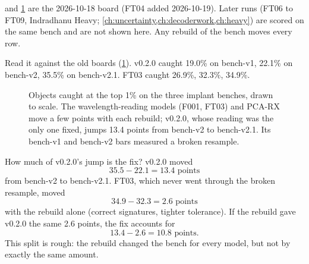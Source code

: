\begin{drift}
 and \cref{fig:sortbug:bars} are the 2026-10-18 board (FT04 added 2026-10-19). Later runs
(FT06 to FT09, Indradhanu Heavy; \cref{ch:uncertainty,ch:decoderwork,ch:heavy}) are scored on the same bench and
are not shown here. Any rebuild of the bench moves every row.
\end{drift}

Read it against the old boards (\cref{fig:sortbug:bars}). v0.2.0 caught 19.0\% on bench-v1, 22.1\% on bench-v2,
35.5\% on bench-v2.1. FT03 caught 26.9\%, 32.3\%, 34.9\%.

\begin{figure}[htbp]
\centering
{}
\caption{Objects caught at the top 1\% on the three implant benches, drawn to scale. The wavelength-reading models
(F001, FT03) and PCA-RX move a few points with each rebuild; v0.2.0, whose reading was the only one fixed, jumps
13.4 points from bench-v2 to bench-v2.1. Its bench-v1 and bench-v2 bars measured a broken resample.}
\label{fig:sortbug:bars}
\end{figure}

\begin{worked}[label={we:sortbug:split}]{How much of v0.2.0's jump is the fix?}
v0.2.0 moved
\[
35.5 - 22.1 = 13.4 \text{ points}
\]
from bench-v2 to bench-v2.1. FT03, which never went through the broken resample, moved
\[
34.9 - 32.3 = 2.6 \text{ points}
\]
with the rebuild alone (correct signatures, tighter tolerance). If the rebuild gave v0.2.0 the same 2.6 points,
the fix accounts for
\[
13.4 - 2.6 = 10.8 \text{ points}.
\]
This split is rough: the rebuild changed the bench for every model, but not by exactly the same amount.
\end{worked}

